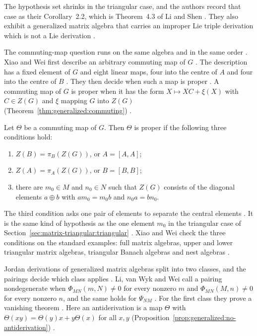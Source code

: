 The hypothesis set shrinks in the triangular case, and the authors record that
case as their Corollary~2.2, which is Theorem~4.3 of Li and Shen
\cite[Corollary~2.2, p.~9]{AshrafAkhtar2020}. They also exhibit a
generalized matrix algebra that carries an improper Lie triple derivation
which is not a Lie derivation \cite[Example~2.1,
p.~8--3659]{AshrafAkhtar2020}.

The commuting-map question runs on the same algebra and in the same order
\cite[p.~2178]{XiaoWei2010}. Xiao and Wei first describe an arbitrary
commuting map of $G$ \cite[Proposition~3.3, p.~2185]{XiaoWei2010}. The
description has a fixed element of $G$ and eight linear maps, four into the
centre of $A$ and four into the centre of $B$ \cite[p.~2185]{XiaoWei2010}.
They then decide when such a map is proper \cite[Proposition~3.5,
p.~2189]{XiaoWei2010}. A commuting map of $G$ is proper when it has the form
$X\mapsto XC+\xi(X)$ with $C\in Z(G)$ and $\xi$ mapping $G$ into $Z(G)$
(Theorem~\ref{thm:generalized:commuting}) \cite[p.~2184]{XiaoWei2010}.

\begin{theorem}\label{thm:generalized:commuting}
Let $\Theta$ be a commuting map of $G$. Then $\Theta$ is proper if the following
three conditions hold:
\begin{enumerate}
\item $Z(B)=\pi_B(Z(G))$, or $A=[A,A]$;
\item $Z(A)=\pi_A(Z(G))$, or $B=[B,B]$;
\item there are $m_0\in M$ and $n_0\in N$ such that $Z(G)$ consists of the
diagonal elements $a\oplus b$ with $am_0=m_0b$ and $n_0a=bn_0$.
\end{enumerate}
\end{theorem}

The third condition asks one pair of elements to separate the central elements
\cite[p.~2192]{XiaoWei2010}. It is the same kind of hypothesis as the one
element $m_0$ in the triangular case of
Section~\ref{sec:matrix-triangular:triangular} \cite[Theorem~2,
p.~124]{Cheung2001}. Xiao and Wei check the three conditions on the standard
examples: full matrix algebras, upper and lower triangular matrix algebras,
triangular Banach algebras and nest algebras \cite[Section~2,
pp.~2182--2184]{XiaoWei2010}.

Jordan derivations of generalized matrix algebras split into two classes, and
the pairings decide which class applies \cite[p.~13]{LiVanWykWei2012}. Li, van
Wyk and Wei call a pairing nondegenerate when $\Phi_{MN}(m,N)\neq0$ for every
nonzero $m$ and $\Phi_{MN}(M,n)\neq0$ for every nonzero $n$, and the same
holds for $\Psi_{NM}$ \cite[Definition~3.7, p.~12]{LiVanWykWei2012}. For the
first class they prove a vanishing theorem \cite[Proposition~3.10,
p.~13]{LiVanWykWei2012}. Here an antiderivation is a map $\Theta$ with
$\Theta(xy)=\Theta(y)x+y\Theta(x)$ for all $x,y$
(Proposition~\ref{prop:generalized:no-antiderivation})
\cite[p.~2]{LiVanWykWei2012}.

